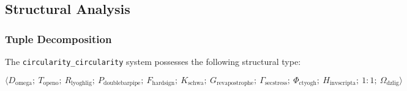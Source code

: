 \documentclass[12pt,a4paper]{article}
\begin{document}
\subsection{Structural Analysis}

\subsubsection{Tuple Decomposition}

The \texttt{circularity\_circularity} system possesses the following structural type:

\[\langle D_{\text{omega}};\ T_{\text{openo}};\ R_{\text{lyoghlig}};\ P_{\text{doublebarpipe}};\ F_{\text{hardsign}};\ K_{\text{schwa}};\ G_{\text{revapostrophe}};\ \Gamma_{\text{secstress}};\ \Phi_{\text{ctyogh}};\ H_{\text{invscripta}};\ 1{:}1;\ \Omega_{\text{dzlig}} \rangle\]
\end{document}

